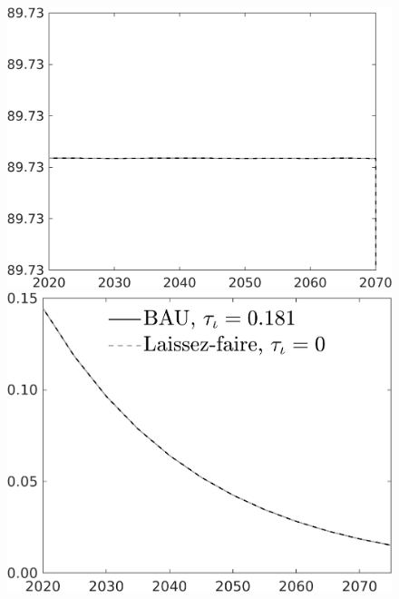 \documentclass[12pt]{article}
\begin{document}
\begin{figure}[h!!]
\begin{minipage}[]{0.32\textwidth}
	\end{minipage}	
	\begin{minipage}[]{0.32\textwidth}
		\includegraphics[width=1\textwidth]{../../codding_model/own_basedOnFried/optimalPol_010922_revision/figures/all_13Sept22/CompTaul_Equlab_LFBAU_Reg0_gAf_spillover0_nsk1_xgr1_knspil1_sep1_countec0_GovRev0_etaa0.79_lgd0.png}
	\end{minipage}	
	\begin{minipage}[]{0.32\textwidth}
		\includegraphics[width=1\textwidth]{../../codding_model/own_basedOnFried/optimalPol_010922_revision/figures/all_13Sept22/CompTaul_Equlab_LFBAU_Reg0_pf_spillover0_nsk1_xgr1_knspil1_sep1_countec0_GovRev0_etaa0.79_lgd1.png}

\end{minipage}
\end{figure}
\end{document}
